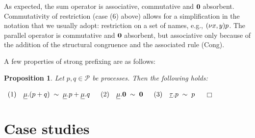 \documentclass[submission,copyright,creativecommons]{eptcs}
\newcommand{\fine}{{\mbox{ }\nolinebreak\hfill{$\Box$}}}
\newcommand{\restr}[1]{\mbox{$({\bf\nu} #1)$}}
\newcommand{\nil}{\mbox{\bf 0}}
\newtheorem{aproposition}[adefinition]{Proposition}
\newenvironment{proposition}{\begin{aproposition}}{\end{aproposition}}
\newcommand{\proof}{{\it Proof:}\ \ }
\begin{document}
As expected, the sum operator is associative, commutative and $\nil$ absorbent. 
Commutativity of restriction (case (6) above) allows for
a simplification in the notation that we usually adopt: restriction on a set of names, e.g., $\restr{x,y}p$.
The parallel operator is
commutative and $\nil$ absorbent, but associative only because of the addition of the structural congruence
and the associated rule (Cong).

A few properties of strong prefixing are as follows:

\begin{proposition}\label{prop}
Let $p, q \in {\mathcal P}$ be processes. Then the following holds:

$\begin{array}{lllllr}
(1) & \underline\mu.(p + q)  \; \sim \;   \underline\mu.p +  \underline\mu.q & \; \;
(2) &  \underline\mu.\nil  \; \sim \;   \nil & \; \;
(3) &  \underline\tau.p   \; \sim \;  p \\
\end{array}
$
\fine
\end{proposition}




\section{Case studies}\label{multi-ex}
\end{document}
